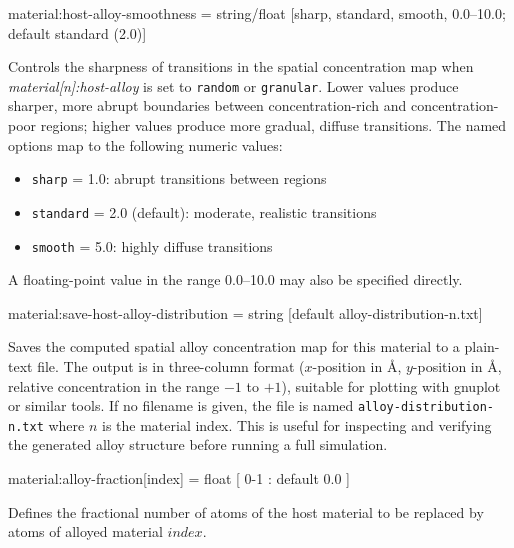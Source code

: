 {\zicf material:host-alloy-smoothness = string/float [sharp, standard, smooth, 0.0--10.0; default standard (2.0)]} Controls the sharpness of transitions in the spatial concentration map when \textit{material[n]:host-alloy} is set to \texttt{random} or \texttt{granular}. Lower values produce sharper, more abrupt boundaries between concentration-rich and concentration-poor regions; higher values produce more gradual, diffuse transitions. The named options map to the following numeric values:
\begin{itemize}
  \item[] \texttt{sharp} = 1.0: abrupt transitions between regions
  \item[] \texttt{standard} = 2.0 (default): moderate, realistic transitions
  \item[] \texttt{smooth} = 5.0: highly diffuse transitions
\end{itemize}
A floating-point value in the range 0.0--10.0 may also be specified directly.

{\zicf material:save-host-alloy-distribution = string [default alloy-distribution-n.txt]} Saves the computed spatial alloy concentration map for this material to a plain-text file. The output is in three-column format ($x$-position in \AA, $y$-position in \AA, relative concentration in the range $-1$ to $+1$), suitable for plotting with gnuplot or similar tools. If no filename is given, the file is named \texttt{alloy-distribution-n.txt} where $n$ is the material index. This is useful for inspecting and verifying the generated alloy structure before running a full simulation.

{\zicf material:alloy-fraction[index] = float [ 0-1 : default 0.0 ]} Defines the fractional number of atoms of the host material to be replaced by atoms of alloyed material $index$.

